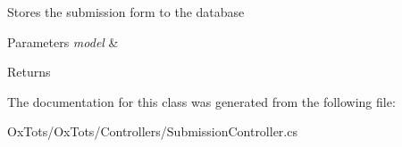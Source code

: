 Stores the submission form to the database 


\begin{DoxyParams}{Parameters}
{\em model} & \\
\hline
\end{DoxyParams}
\begin{DoxyReturn}{Returns}

\end{DoxyReturn}


The documentation for this class was generated from the following file\+:\begin{DoxyCompactItemize}
\item 
Ox\+Tots/\+Ox\+Tots/\+Controllers/Submission\+Controller.\+cs\end{DoxyCompactItemize}
